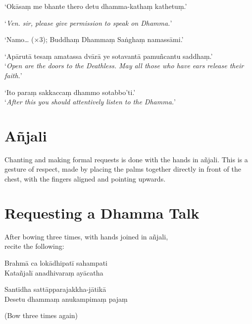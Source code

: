 ‘Okāsaṃ me bhante thero detu dhamma-kathaṃ kathetuṃ.’

‘\emph{Ven. sir, please give permission to speak on Dhamma.}’

‘Namo… (×3); Buddhaṃ Dhammaṃ Saṅghaṃ namassāmi.’


‘Apārutā tesaṃ amatassa dvārā ye sotavantā pamuñcantu saddhaṃ.’\\
‘\emph{Open are the doors to the Deathless. May all those who have ears release their faith.}’

‘Ito paraṃ sakkaccaṃ dhammo sotabbo'ti.’\\
‘\emph{After this you should attentively listen to the Dhamma.}’

\section{Añjali}

Chanting and making formal requests is done with the hands in añjali.
This is a gesture of respect, made by placing the palms together
directly in front of the chest, with the fingers aligned and pointing
upwards.

\section{Requesting a Dhamma Talk}

\ifhandbookedition
\enlargethispage{\baselineskip}
\fi

\vspace*{-0.2\baselineskip}

\begin{instruction}
  After bowing three times, with hands joined in añjali,\\
  recite the following:
\end{instruction}

\vspace*{\parskip}

\begin{paritta}
Brahmā ca lokādhipatī sahampati\\
Katañjalī anadhivaraṃ ayācatha

Santīdha sattāpparajakkha-jātikā\\
Desetu dhammaṃ anukampimaṃ pajaṃ
\end{paritta}

\begin{instruction}
  (Bow three times again)
\end{instruction}

